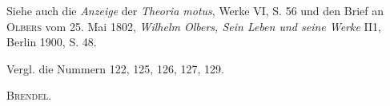 \renewcommand{\thefootnote}{[*)}
\footnotetext{Vergl. die folgende Nr. 120.]}
\par\noindent\hspace*{\parindent}Siehe auch die \textit{Anzeige} der \textit{Theoria motus}, Werke VI, S. 56 und den Brief an \textsc{Olbers} vom 25. Mai 1802, \textit{Wilhelm Olbers, Sein Leben und seine Werke} II1, Berlin 1900, S. 48.
\par\noindent\hspace*{\parindent}Vergl. die Nummern 122, 125, 126, 127, 129.
\par\noindent\hfill\textsc{Brendel.}
\par\endgroup
